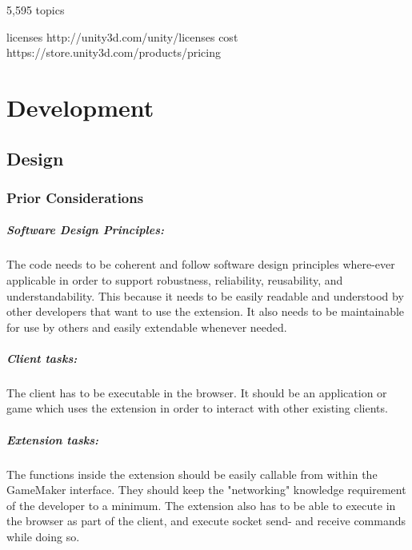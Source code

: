 \documentclass[bsc,frontabs,twoside,singlespacing,parskip,deptreport]{infthesis}     %
\begin{document}
5,595 topics

licenses http://unity3d.com/unity/licenses
cost https://store.unity3d.com/products/pricing



\chapter{Development}
\section{Design}
\subsection{Prior Considerations}
\paragraph*{Software Design Principles:}
The code needs to be coherent and follow software design principles where-ever applicable in order to support robustness, reliability, reusability, and understandability. This because it needs to be easily readable and understood by other developers that want to use the extension. It also needs to be maintainable for use by others and easily extendable whenever needed.
\paragraph*{Client tasks:}
The client has to be executable in the browser. It should be an application or game which uses the extension in order to interact with other existing clients.
\paragraph*{Extension tasks:}
The functions inside the extension should be easily callable from within the GameMaker interface. They should keep the "networking" knowledge requirement of the developer to a minimum. The extension also has to be able to execute in the browser as part of the client, and execute socket send- and receive commands while doing so.
\end{document}

